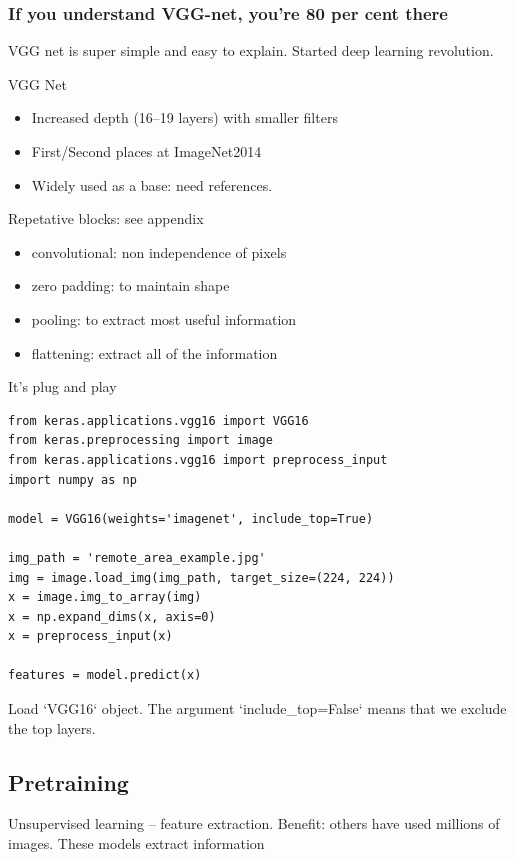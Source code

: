 \documentclass[12pt, a4paper, oneside, headinclude, footinclude]{article}
\begin{document}
\subsubsection{If you understand VGG-net, you're 80 per cent there}

VGG net is super simple and easy to explain. Started deep learning revolution.

VGG Net~\cite{SimonyanZ14a}
\begin{itemize}
    \item Increased depth (16--19 layers) with smaller filters
    \item First/Second places at ImageNet2014
    \item Widely used as a base: need references.
\end{itemize}

Repetative blocks: see appendix
\begin{itemize}
    \item convolutional: non independence of pixels
    \item zero padding: to maintain shape
    \item pooling: to extract most useful information
    \item flattening: extract all of the information
\end{itemize}

It's plug and play

\begin{verbatim}
from keras.applications.vgg16 import VGG16
from keras.preprocessing import image
from keras.applications.vgg16 import preprocess_input
import numpy as np

model = VGG16(weights='imagenet', include_top=True)

img_path = 'remote_area_example.jpg'
img = image.load_img(img_path, target_size=(224, 224))
x = image.img_to_array(img)
x = np.expand_dims(x, axis=0)
x = preprocess_input(x)

features = model.predict(x)
\end{verbatim}

Load `VGG16` object. The argument `include_top=False` means that we exclude
the top layers. 

\subsection{Pretraining}

Unsupervised learning -- feature extraction. Benefit: others have used
millions of images. These models extract information
\end{document}
